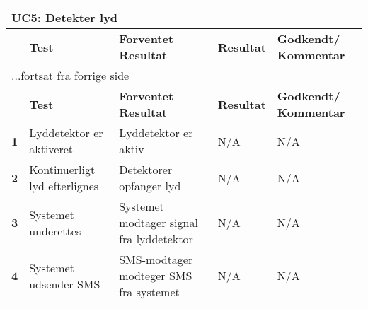 
\begin{center}
\begin{longtable}{|p{}|p{}|p{}|p{}|p{}|} %
\hline
\multicolumn{5}{|l|}{\textbf{UC5: Detekter lyd}} \\ \hline
\multicolumn{1}{|c|}{} &
\textbf{Test} &
\textbf{Forventet \newline Resultat} &
\textbf{Resultat} &
\textbf{Godkendt/ \newline Kommentar} \\ \hline 
\endfirsthead

\multicolumn{5}{l}{...fortsat fra forrige side} \\ \hline 
\multicolumn{1}{|c|}{} &
\textbf{Test} &
\textbf{Forventet \newline Resultat} &
\textbf{Resultat} &
\textbf{Godkendt/ \newline Kommentar} \\ \hline 
\endhead



\textbf{1}		
&Lyddetektor er aktiveret
&Lyddetektor er aktiv	
&N/A 	
&N/A \\\hline
\textbf{2}		
&Kontinuerligt lyd efterlignes	
&Detektorer opfanger lyd
&N/A 	
&N/A \\\hline
\textbf{3}		
&Systemet underettes	
&Systemet modtager signal fra lyddetektor 
&N/A 	
&N/A  \\\hline
\textbf{4}		
&Systemet udsender SMS
&SMS-modtager modteger SMS fra systemet
&N/A 	
&N/A \\\hline
	\end{longtable}
	\label{ATUC5} 
\end{center}

